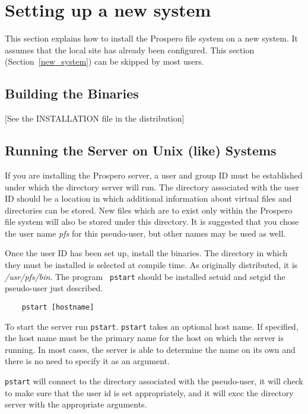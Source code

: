 \section{Setting up a new system\label{new_system}}

This section explains how to install the Prospero file system on a new
system.  It assumes that the local site has already been configured.  
This section (Section~\ref{new_system}) can be skipped by most users.

\subsection{Building the Binaries\label{compiling}}

[See the INSTALLATION file in the distribution]

\subsection{Running the Server on Unix (like) Systems}

If you are installing the Prospero server, a user and group ID must be
established under which the directory server will run.  The directory
associated with the user ID should be a location in which additional
information about virtual files and directories can be stored.  New
files which are to exist only within the Prospero file system will
also be stored under this directory.  It is suggested that you chose
the user name {\it pfs} for this pseudo-user, but other names may be
used as well.

Once the user ID has been set up, install the binaries.  The directory
in which they must be installed is selected at compile time.  As
originally distributed, it is {\it /usr/pfs/bin}.  The program {\tt
pstart} should be installed setuid and setgid the pseudo-user just
described.

\begin{verbatim}
    pstart [hostname]
\end{verbatim}

To start the server run {\tt pstart}.  {\tt pstart} takes an optional
host name.  If specified, the host name must be the primary name for
the host on which the server is running.  In most cases, the server is
able to determine the name on its own and there is no need to specify
it as an argument.

{\tt pstart} will connect to the directory associated with the
pseudo-user, it will check to make sure that the user id is set
appropriately, and it will exec the directory server with the
appropriate arguments.

